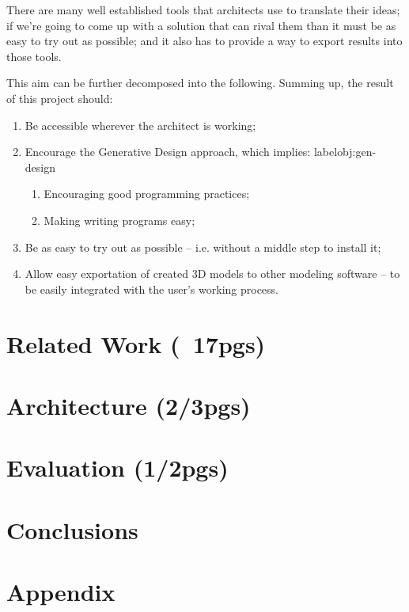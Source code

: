 \documentclass{./llncs2e/llncs}
\begin{document}
There are many well established tools that architects use to translate their ideas; if we're going to come up with a solution that can rival them than it must be as easy to try out as possible; and it also has to provide a way to export results into those tools.

This aim can be further decomposed into the following.
Summing up, the result of this project should:
\begin{enumerate}
	\item Be accessible wherever the architect is working; \label{obj:access}
	\item Encourage the Generative Design approach, which implies: label{obj:gen-design}
	\begin{enumerate}
		\item Encouraging good programming practices; \label{obj:good-prog-practs} 
		\item Making writing programs easy; \label{obj:easy-program}
	\end{enumerate}
	\item Be as easy to try out as possible -- i.e. without a middle step to install it; \label{obj:no-install}
	\item Allow easy exportation of created 3D models to other modeling software -- to be easily integrated with the user's working process. \label{obj:inter-op}
\end{enumerate}


\section{Related Work (~17pgs)}

\section{Architecture (2/3pgs)}

\section{Evaluation (1/2pgs)}

\section{Conclusions}

\newpage
\appendix
\section{Appendix}
\label{sec:attachments}


% 
% 
 

 
\end{document}
